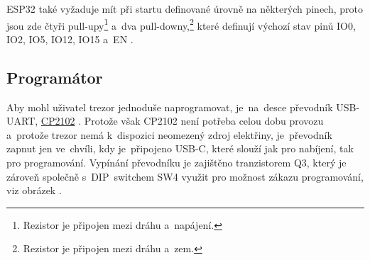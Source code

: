 ESP32 také vyžaduje mít při startu definované úrovně na některých pinech, proto jsou zde čtyři pull-upy\footnote{Rezistor je připojen mezi dráhu a~napájení.} 
a~dva pull-downy,\footnote{Rezistor je připojen mezi dráhu a~zem.} které definují výchozí stav pinů IO0, IO2, IO5, IO12, IO15 a~EN \parencite{ESP32}.
\begin{table}[h]
    \centering
    \caption{Popis funkce pinů} \label{tab:COMPARATION}
\end{table}
\vspace{-5mm}



\subsection*{Programátor}
\label{programator}
Aby mohl uživatel trezor jednoduše naprogramovat, je~na~desce převodník USB-UART, 
\href{https://www.silabs.com/documents/public/data-sheets/cp2102n-datasheet.pdf}{CP2102} \parencite{cp2102}.
Protože však CP2102 není potřeba celou dobu provozu a~protože trezor nemá k~dispozici neomezený zdroj elektřiny, 
je~převodník zapnut jen ve~chvíli, 
kdy je~připojeno USB-C, které slouží jak pro nabíjení, tak pro programování. 
Vypínání převodníku je zajištěno tranzistorem Q3, který je zároveň společně 
s~DIP~switchem SW4 využit pro možnost zákazu programování, viz obrázek .